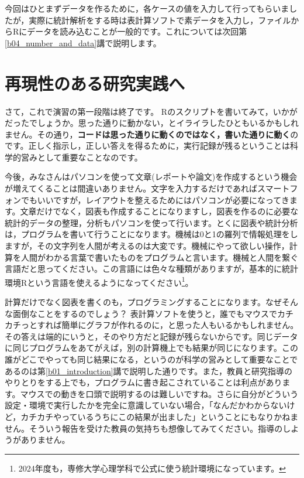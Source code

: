 \documentclass{ltjsbook}
\begin{document}
今回はひとまずデータを作るために，各ケースの値を入力して行ってもらいましたが，実際に統計解析をする時は表計算ソフトで素データを入力し，ファイルからRにデータを読み込むことが一般的です。これについては次回第\ref{b04_number_and_data}講で説明します。


\section{再現性のある研究実践へ}
\label{reproducibility}

さて，これで演習の第一段階は終了です。
Rのスクリプトを書いてみて，いかがだったでしょうか。思った通りに動かない，とイライラしたひともいるかもしれません。その通り，\textbf{コードは思った通りに動くのではなく，書いた通りに動く}のです。正しく指示し，正しい答えを得るために，実行記録が残るということは科学的営みとして重要なことなのです。

今後，みなさんはパソコンを使って文章(レポートや論文)を作成するという機会が増えてくることは間違いありません。文字を入力するだけであればスマートフォンでもいいですが，レイアウトを整えるためにはパソコンが必要になってきます。文章だけでなく，図表も作成することになりますし，図表を作るのに必要な統計的データの整理，分析もパソコンを使って行います。とくに図表や統計分析は，プログラムを書いて行うことになります。機械は0と1の羅列で情報処理をしますが，その文字列を人間が考えるのは大変です。機械にやって欲しい操作，計算を人間がわかる言葉で書いたものをプログラムと言います。機械と人間を繋ぐ言語だと思ってください。この言語には色々な種類がありますが，基本的に統計環境Rという言語を使えるようになってください\footnote{2024年度も，専修大学心理学科で公式に使う統計環境になっています。}。

計算だけでなく図表を書くのも，プログラミングすることになります。なぜそんな面倒なことをするのでしょう？ 表計算ソフトを使うと，誰でもマウスでカチカチっとすれば簡単にグラフが作れるのに，と思った人もいるかもしれません。その答えは端的にいうと，そのやり方だと記録が残らないからです。同じデータに同じプログラムをあてがえば，別の計算機上でも結果が同じになります。この誰がどこでやっても同じ結果になる，というのが科学の営みとして重要なことであるのは第\ref{b01_introduction}講で説明した通りです。また，教員と研究指導のやりとりをする上でも，プログラムに書き起こされていることは利点があります。マウスでの動きを口頭で説明するのは難しいですね。さらに自分がどういう設定・環境で実行したかを完全に意識していない場合，「なんだかわからないけど，カチカチやっているうちにこの結果が出ました」ということにもなりかねません。そういう報告を受けた教員の気持ちも想像してみてください。指導のしようがありません。
\end{document}
